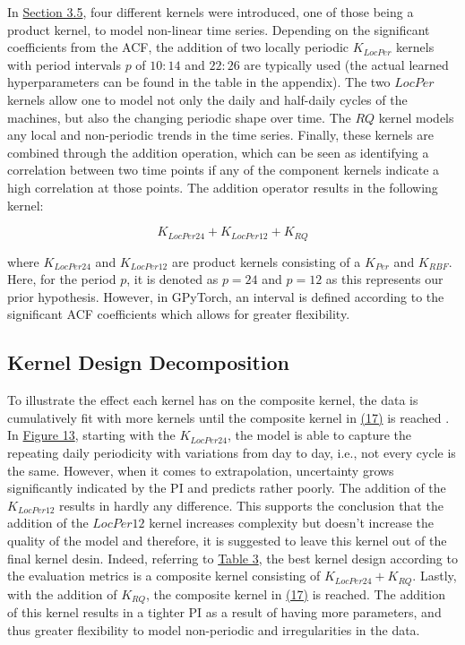 In \hyperlink{subsection.3.5}{Section 3.5}, four different kernels were introduced, one of those being a product kernel, to model non-linear time series. Depending on the significant coefficients from the ACF, the addition of two locally periodic $K_{LocPer}$ kernels with period intervals $p$ of $10:14$ and $22:26$ are typically used (the actual learned hyperparameters can be found in the table in the appendix). The two $LocPer$ kernels allow one to model not only the daily and half-daily cycles of the machines, but also the changing periodic shape over time. The $RQ$ kernel models any local and non-periodic trends in the time series. Finally, these kernels are combined through the addition operation, which can be seen as identifying a correlation between two time points if any of the component kernels indicate a high correlation at those points. The addition operator results in the following kernel:

\begin{equation}
    K_{LocPer24} + K_{LocPer12} + K_{RQ}
\end{equation}

where $K_{LocPer24}$  and $K_{LocPer12}$ are product kernels consisting of a $K_{Per}$ and $K_{RBF}$. Here, for the period $p$, it is denoted as $p = 24$ and $p = 12$ as this represents our prior hypothesis. However, in GPyTorch, an interval is defined according to the significant ACF coefficients which allows for greater flexibility.    

\subsection{Kernel Design Decomposition}

To illustrate the effect each kernel has on the composite kernel, the data is cumulatively fit with more kernels until the composite kernel in \hyperlink{equation.17}{(17)} is reached \cite{gp_prices}. In \hyperlink{figure.13}{Figure 13}, starting with the $K_{LocPer24}$, the model is able to capture the repeating daily periodicity with variations from day to day, i.e., not every cycle is the same. However, when it comes to extrapolation, uncertainty grows significantly indicated by the PI and predicts rather poorly. The addition of the $K_{LocPer12}$ results in hardly any difference. This supports the conclusion that the addition of the $LocPer12$ kernel increases complexity but doesn't increase the quality of the model and therefore, it is suggested to leave this kernel out of the final kernel desin. Indeed, referring to \hyperlink{table.3}{Table 3}, the best kernel design according to the evaluation metrics is a composite kernel consisting of $K_{LocPer24} + K_{RQ}$. Lastly, with the addition of $K_{RQ}$, the composite kernel in \hyperlink{equation.17}{(17)} is reached. The addition of this kernel results in a tighter PI as a result of having more parameters, and thus greater flexibility to model non-periodic and irregularities in the data.

